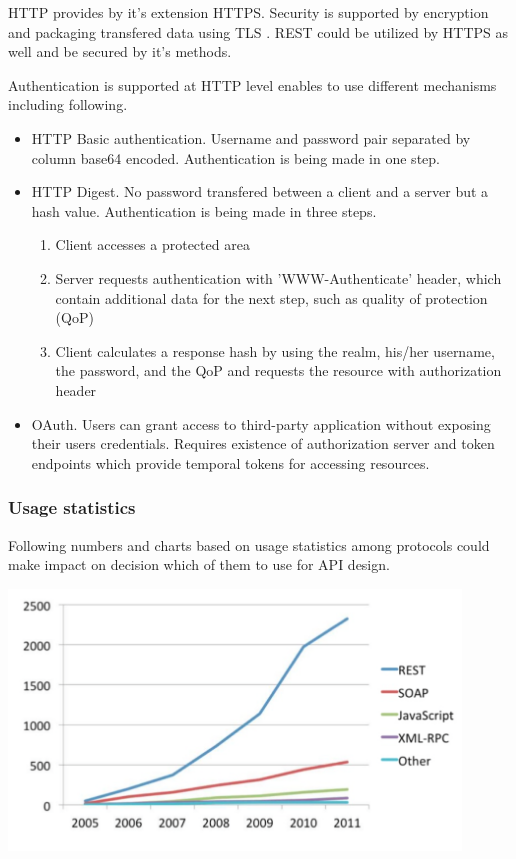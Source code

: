 \documentclass[thesis=M,english]{FITthesis}[2012/10/20]
\begin{document}
HTTP provides by it's extension HTTPS. Security is supported by encryption and packaging transfered data using TLS \cite{tls}. REST could be utilized by HTTPS as well and be secured by it's methods.

Authentication is supported at HTTP level enables to use different mechanisms including following.

\begin{itemize}

	\item HTTP Basic authentication. Username and password pair separated by column base64 encoded. Authentication is being made in one step.
	\item HTTP Digest. No password transfered between a client and a server but a hash value. Authentication is being made in three steps. 
	\begin{enumerate}
		\item Client accesses a protected area
		\item Server requests authentication with 'WWW-Authenticate' header, which contain additional data for the next step, such as quality of protection (QoP)
		\item Client calculates a response hash by using the realm, his/her username, the password, and the QoP and requests the resource with authorization header

	\end{enumerate}

	\item OAuth. Users can grant access to third-party application without exposing their users credentials. Requires existence of authorization server and token endpoints which provide temporal tokens for accessing resources.

\end{itemize}



\subsubsection{Usage statistics}

Following numbers and charts based on usage statistics among protocols could make impact on decision which of them to use for API design.

\includegraphics[width=0.9\textwidth]{images/rest_vs_orthers_over_years}
\end{document}
